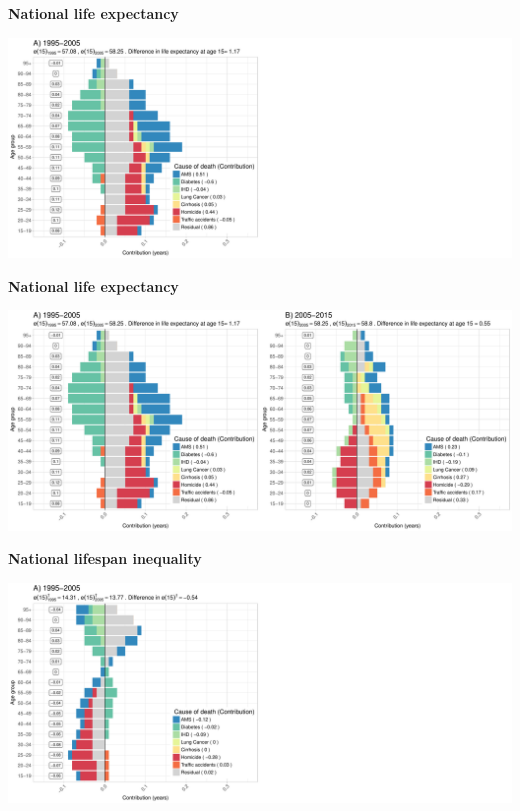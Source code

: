 \documentclass[xcolor={dvipsnames}]{beamer}
\begin{document}
\begin{frame}
\begin{center}
\Large{\textbf{National life expectancy}}
\end{center}

\hspace*{-1cm}   
\includegraphics[scale=.31]{Figures/Figure_1_2}

\end{frame}


\begin{frame}
\begin{center}
\Large{\textbf{National life expectancy}}
\end{center}

\hspace*{-1cm}   
\includegraphics[scale=.31]{Figures/Figure_1}

\end{frame}


\begin{frame}
\begin{center}
\Large{\textbf{National lifespan inequality}}
\end{center}

\hspace*{-1cm}   
\includegraphics[scale=.31]{Figures/Figure_2_2}

\end{frame}
\end{document}
